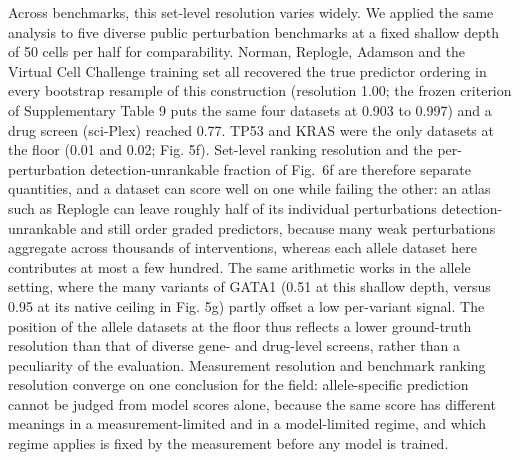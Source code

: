 \documentclass[11pt,letterpaper]{article}
\begin{document}
Across benchmarks, this set-level resolution varies widely. We applied the same analysis to five diverse public perturbation benchmarks at a fixed shallow depth of 50 cells per half for comparability. Norman, Replogle, Adamson and the Virtual Cell Challenge training set\cite{VirtualCellChallenge2025} all recovered the true predictor ordering in every bootstrap resample of this construction (resolution 1.00; the frozen criterion of Supplementary Table 9 puts the same four datasets at 0.903 to 0.997) and a drug screen (sci-Plex\cite{SciPlex2020}) reached 0.77. TP53 and KRAS were the only datasets at the floor (0.01 and 0.02; Fig. 5f). Set-level ranking resolution and the per-perturbation detection-unrankable fraction of Fig.~6f are therefore separate quantities, and a dataset can score well on one while failing the other: an atlas such as Replogle can leave roughly half of its individual perturbations detection-unrankable and still order graded predictors, because many weak perturbations aggregate across thousands of interventions, whereas each allele dataset here contributes at most a few hundred. The same arithmetic works in the allele setting, where the many variants of GATA1 (0.51 at this shallow depth, versus 0.95 at its native ceiling in Fig. 5g) partly offset a low per-variant signal. The position of the allele datasets at the floor thus reflects a lower ground-truth resolution than that of diverse gene- and drug-level screens, rather than a peculiarity of the evaluation. Measurement resolution and benchmark ranking resolution converge on one conclusion for the field: allele-specific prediction cannot be judged from model scores alone, because the same score has different meanings in a measurement-limited and in a model-limited regime, and which regime applies is fixed by the measurement before any model is trained.
\end{document}
